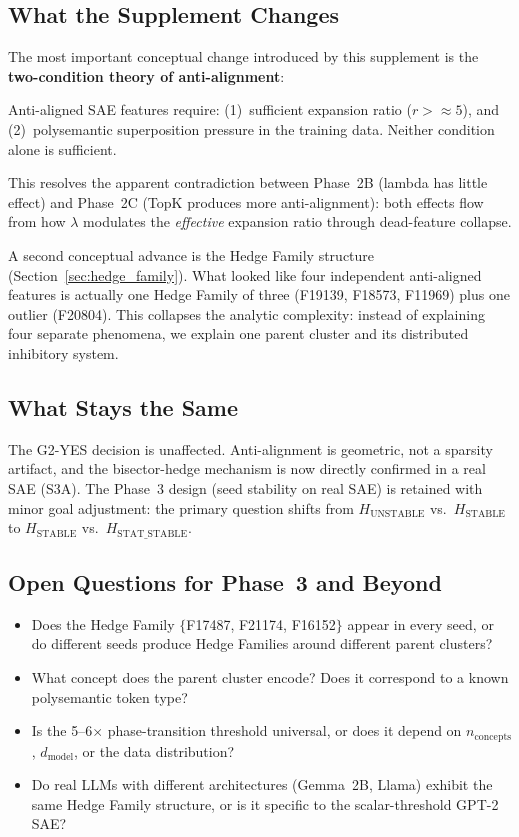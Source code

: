 \documentclass[11pt,a4paper]{article}
\begin{document}
\subsection{What the Supplement Changes}

The most important conceptual change introduced by this supplement is the
\textbf{two-condition theory of anti-alignment}:

\begin{keyinsight}
Anti-aligned SAE features require:
(1)~sufficient expansion ratio ($r > {\approx}5$), and
(2)~polysemantic superposition pressure in the training data.
Neither condition alone is sufficient.
\end{keyinsight}

This resolves the apparent contradiction between Phase~2B (lambda has little effect)
and Phase~2C (TopK produces more anti-alignment): both effects flow from how $\lambda$
modulates the \emph{effective} expansion ratio through dead-feature collapse.

A second conceptual advance is the Hedge Family structure (Section~\ref{sec:hedge_family}).
What looked like four independent anti-aligned features is actually one Hedge Family of
three (F19139, F18573, F11969) plus one outlier (F20804).  This collapses the analytic
complexity: instead of explaining four separate phenomena, we explain one parent cluster
and its distributed inhibitory system.

\subsection{What Stays the Same}

The G2-YES decision is unaffected.  Anti-alignment is geometric, not a sparsity artifact,
and the bisector-hedge mechanism is now directly confirmed in a real SAE (S3A).
The Phase~3 design (seed stability on real SAE) is retained with minor goal adjustment:
the primary question shifts from $H_{\mathrm{UNSTABLE}}$ vs.\ $H_{\mathrm{STABLE}}$
to $H_{\mathrm{STABLE}}$ vs.\ $H_{\mathrm{STAT\_STABLE}}$.

\subsection{Open Questions for Phase~3 and Beyond}

\begin{itemize}[noitemsep]
  \item Does the Hedge Family $\{$F17487, F21174, F16152$\}$ appear in every seed,
    or do different seeds produce Hedge Families around different parent clusters?
  \item What concept does the parent cluster encode?  Does it correspond to
    a known polysemantic token type?
  \item Is the 5--6$\times$ phase-transition threshold universal, or does it depend
    on $n_{\mathrm{concepts}}$, $d_{\mathrm{model}}$, or the data distribution?
  \item Do real LLMs with different architectures (Gemma~2B, Llama) exhibit the same
    Hedge Family structure, or is it specific to the scalar-threshold GPT-2 SAE?
\end{itemize}
\end{document}
